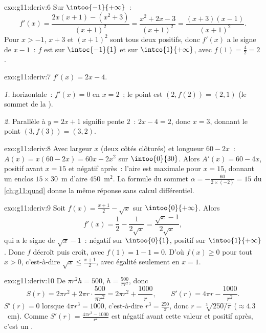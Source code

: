 \begin{solution}{exo:g11:deriv:6}
Sur $\intoo{-1}{+\infty}$~:
\[
f'(x) = \frac{2x(x+1) - (x^2+3)}{(x+1)^2}
= \frac{x^2 + 2x - 3}{(x+1)^2}
= \frac{(x+3)(x-1)}{(x+1)^2}.
\]
Pour $x > -1$, $x + 3$ et $(x+1)^2$ sont tous deux positifs, donc
$f'(x)$ a le signe de $x - 1$~: $f$ est  sur
$\intoc{-1}{1}$ et  sur $\intco{1}{+\infty}$, avec 
$f(1) = \frac{4}{2} = 2$.
\end{solution}

\begin{solution}{exo:g11:deriv:7}
$f'(x) = 2x - 4$.

\emph{1.}  horizontale~: $f'(x) = 0$ en $x = 2$~; le point est
$(2, f(2)) = (2, 1)$ (le sommet de la ).

\emph{2.} Parallèle à $y = 2x + 1$ signifie pente $2$~: $2x - 4 = 2$,
donc $x = 3$, donnant le point $(3, f(3)) = (3, 2)$.
\end{solution}

\begin{solution}{exo:g11:deriv:8}
Avec largeur $x$ (deux côtés clôturés) et longueur $60 - 2x$~:
$A(x) = x(60 - 2x) = 60x - 2x^2$ sur $\intoo{0}{30}$. Alors
$A'(x) = 60 - 4x$, positif avant $x = 15$ et négatif après~: l'aire est
maximale pour $x = 15$, donnant un enclos $15 \times 30$~m d'aire
$450$~m$^2$. La formule du sommet $\alpha = -\frac{60}{2 \times (-2)} =
15$ du \cref{ch:g11:quad} donne la même réponse sans calcul
différentiel.
\end{solution}

\begin{solution}{exo:g11:deriv:9}
Soit $f(x) = \frac{x+1}{2} - \sqrt x$ sur $\intoo{0}{+\infty}$. Alors
\[
f'(x) = \frac12 - \frac{1}{2\sqrt x} = \frac{\sqrt x - 1}{2\sqrt x},
\]
qui a le signe de $\sqrt x - 1$~: négatif sur $\intoo{0}{1}$, positif
sur $\intoo{1}{+\infty}$. Donc $f$ décroît puis croît, avec 
$f(1) = 1 - 1 = 0$. D'où $f(x) \geq 0$ pour tout $x > 0$,
c'est-à-dire $\sqrt x \leq \frac{x+1}{2}$, avec égalité seulement en
$x = 1$.
\end{solution}

\begin{solution}{exo:g11:deriv:10}
De $\pi r^2 h = 500$, $h = \frac{500}{\pi r^2}$, donc
\[
S(r) = 2\pi r^2 + 2\pi r \cdot \frac{500}{\pi r^2}
= 2\pi r^2 + \frac{1000}{r},
\qquad
S'(r) = 4\pi r - \frac{1000}{r^2}.
\]
$S'(r) = 0$ lorsque $4\pi r^3 = 1000$, c'est-à-dire
$r^3 = \frac{250}{\pi}$, donc $r = \sqrt[3]{250/\pi}$
($\approx 4.3$~cm). Comme $S'(r) = \frac{4\pi r^3 - 1000}{r^2}$ est
négatif avant cette valeur et positif après, c'est un .
\end{solution}

